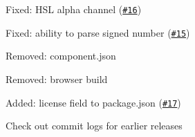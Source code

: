 
\begin{DoxyItemize}
\item Fixed\+: H\+SL alpha channel (\href{https://github.com/harthur/color-string/pull/16}{\tt \#16})
\item Fixed\+: ability to parse signed number (\href{https://github.com/harthur/color-string/pull/15}{\tt \#15})
\item Removed\+: component.\+json
\item Removed\+: browser build
\item Added\+: license field to package.\+json (\href{https://github.com/harthur/color-string/pull/17}{\tt \#17}) 


\end{DoxyItemize}

Check out commit logs for earlier releases 